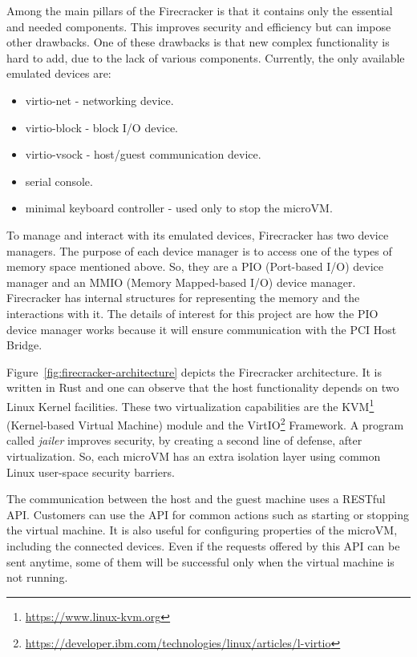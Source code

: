 \documentclass[12pt, a4paper]{report}
\begin{document}
Among the main pillars of the Firecracker is that it contains only the essential and needed components. This improves security and efficiency but can impose other drawbacks. One of these drawbacks is that new complex functionality is hard to add, due to the lack of various components. Currently, the only available emulated devices are:
\begin{itemize}
    \item virtio-net - networking device.
    \item virtio-block - block I/O device.
    \item virtio-vsock - host/guest communication device.
    \item serial console.
    \item minimal keyboard controller - used only to stop the microVM.
\end{itemize}

To manage and interact with its emulated devices, Firecracker has two device managers. The purpose of each device manager is to access one of the types of memory space mentioned above. So, they are a PIO (Port-based I/O) device manager and an MMIO (Memory Mapped-based I/O) device manager. Firecracker has internal structures for representing the memory and the interactions with it. The details of interest for this project are how the PIO device manager works because it will ensure communication with the PCI Host Bridge.

Figure~\ref{fig:firecracker-architecture} depicts the Firecracker architecture. It is written in Rust and one can observe that the host functionality depends on two Linux Kernel facilities. These two virtualization capabilities are the KVM\footnote{\url{https://www.linux-kvm.org}} (Kernel-based Virtual Machine) module and the VirtIO\footnote{\url{https://developer.ibm.com/technologies/linux/articles/l-virtio}} Framework. A program called \textit{jailer} improves security, by creating a second line of defense, after virtualization. So, each microVM has an extra isolation layer using common Linux user-space security barriers.

The communication between the host and the guest machine uses a RESTful API\footnotemark. Customers can use the API for common actions such as starting or stopping the virtual machine. It is also useful for configuring properties of the microVM, including the connected devices. Even if the requests offered by this API can be sent anytime, some of them will be successful only when the virtual machine is not running.
\end{document}
